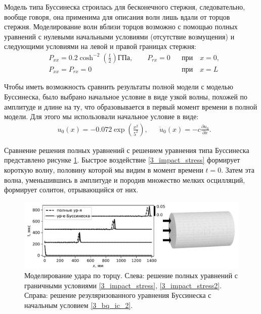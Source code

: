 \documentclass[12pt, a4paper]{report}
\newcommand{\lb}{\left (}
\newcommand{\rb}{\right )}
\newcommand{\pdiff}[2]{\frac{\partial #1}{\partial #2}}
\begin{document}
Модель типа Буссинеска строилась для бесконечного стержня, следовательно, вообще говоря, она применима для описания волн лишь вдали от торцов стержня. Моделирование волн вблизи торцов возможно с помощью полных уравнений с нулевыми начальными условиями (отсутствие возмущения) и следующими условиями на левой и правой границах стержня:
\begin{align}
\label{3_impact_stress}
&P_{xx} = 0.2 \cosh^{-2}\lb\frac t 2\rb\mbox{ГПа}, \qquad P_{rx} = 0&  &\mbox{при}\quad x = 0,\\
\label{3_impact_stress2}
&P_{xx} = P_{rx} = 0&  &\mbox{при}\quad x = L
\end{align}

Чтобы иметь возможность сравнить результаты полной модели с моделью Буссинеска, было выбрано начальное условие в виде узкой волны, похожей по амплитуде и длине на ту, что образовывается в первый момент времени в полной модели. Для этого мы использовали начальное условие в виде:
\begin{align}
\label{3_bq_ic_2}
& u_0 (x) = -0.072 \exp\lb \frac{x^2}{5^2}\rb,&  &\dot{u}_0 (x) = -c \pdiff{u_0}{x}.
\end{align}

Сравнение решения полных уравнений с решением уравнения типа Буссинеска представлено рисунке \ref{fig:impact}. Быстрое воздействие \eqref{3_impact_stress} формирует короткую волну, половину которой мы видим в момент времени $t=0$. Затем эта волна, уменьшившись в амплитуде и породив множество мелких осцилляций, формирует солитон, отрывающийся от них.
\begin{figure}[h]
	\centering
	\includegraphics[width=\linewidth]{Figures/Impact_mod}
	\caption{Моделирование удара по торцу. Слева: решение полных уравнений с граничными условиями \eqref{3_impact_stress}, \eqref{3_impact_stress2}. Справа: решение резуляризованного уравнения Буссинеска с начальным условием \eqref{3_bq_ic_2}.}
	\label{fig:impact}
\end{figure}
\end{document}
